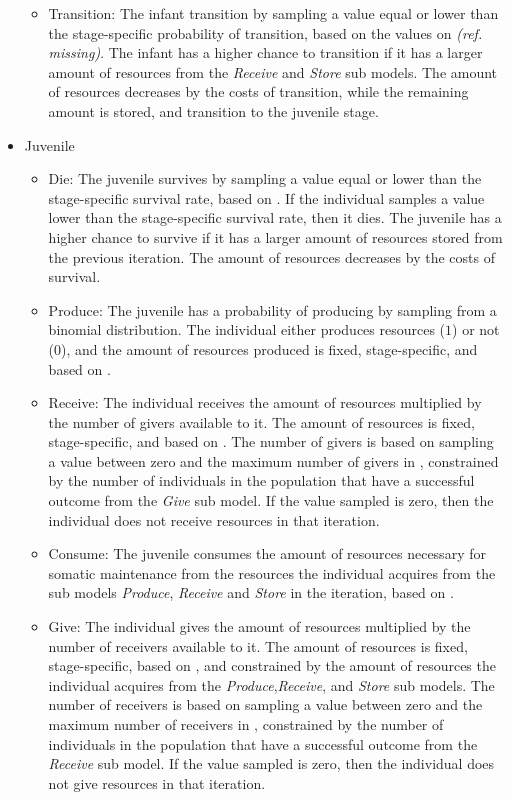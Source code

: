 \documentclass{article}
\begin{document}
\begin{itemize}
\begin{itemize}
        \item Transition: The infant transition by sampling a value equal or lower than the stage-specific probability of transition, based on the values on \emph{(ref. missing)}. The infant has a higher chance to transition if it has a larger amount of resources from the \emph{Receive} and \emph{Store} sub models. The amount of resources decreases by the costs of transition, while the remaining amount is stored, and transition to the juvenile stage.
    \end{itemize}
    \item Juvenile
    \begin{itemize}
        \item Die: The juvenile survives by sampling a value equal or lower than the stage-specific survival rate, based on \cite{gurven2007longevity}. If the individual samples a value lower than the stage-specific survival rate, then it dies. The juvenile has a higher chance to survive if it has a larger amount of resources stored from the previous iteration. The amount of resources decreases by the costs of survival.
        \item Produce: The juvenile has a probability of producing by sampling from a binomial distribution. The individual either produces resources ($1$) or not ($0$), and the amount of resources produced is fixed, stage-specific, and based on \cite{koster2020life}.
        \item Receive: The individual receives the amount of resources multiplied by the number of givers available to it. The amount of resources is fixed, stage-specific, and based on \cite{gurven2004give}. The number of givers is based on sampling a value between zero and the maximum number of givers in \cite{gurven2004give}, constrained by the number of individuals in the population that have a successful outcome from the \emph{Give} sub model. If the value sampled is zero, then the individual does not receive resources in that iteration.
        \item Consume: The juvenile consumes the amount of resources necessary for somatic maintenance from the resources the individual acquires from the sub models \emph{Produce}, \emph{Receive} and \emph{Store} in the iteration, based on \cite{kaplan2000theory, pontzer2021daily}.
        \item Give: The individual gives the amount of resources multiplied by the number of receivers available to it. The amount of resources is fixed, stage-specific, based on \cite{gurven2004give}, and constrained by the amount of resources the individual acquires from the \emph{Produce},\emph{Receive}, and \emph{Store} sub models. The number of receivers is based on sampling a value between zero and the maximum number of receivers in \cite{gurven2004give}, constrained by the number of individuals in the population that have a successful outcome from the \emph{Receive} sub model. If the value sampled is zero, then the individual does not give resources in that iteration.

\end{itemize}
\end{itemize}
\end{document}
